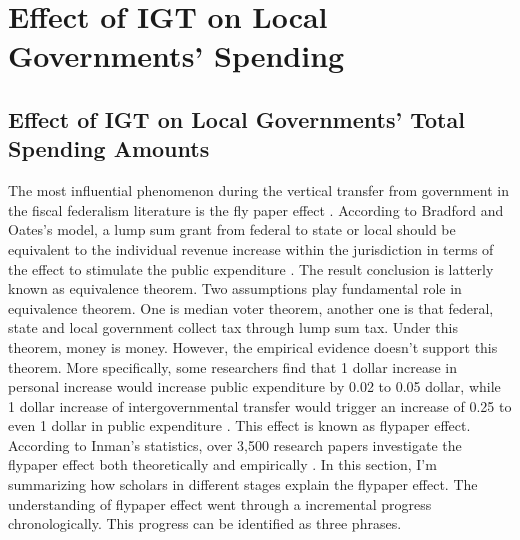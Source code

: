 \section{Effect of IGT on Local Governments' Spending}

\subsection*{Effect of IGT on Local Governments' Total Spending Amounts}
The most influential phenomenon during the vertical transfer from government in the fiscal federalism literature is the fly paper effect \cite{hines1995anomalies,gamkhar2007impact}. According to Bradford and Oates’s model, a lump sum grant from federal to state or local should be equivalent to the individual revenue increase within the jurisdiction in terms of the effect to stimulate the public expenditure \cite{bradford1971analysis}. The result conclusion is latterly known as equivalence theorem. Two assumptions play fundamental role in equivalence theorem. One is median voter theorem, another one is that federal, state and local government collect tax through lump sum tax. Under this theorem, money is money. However, the empirical evidence doesn’t support this theorem. More specifically, some researchers find that 1 dollar increase in personal increase would increase public expenditure by 0.02 to 0.05 dollar, while 1 dollar increase of intergovernmental transfer would trigger an increase of 0.25 to even 1 dollar in public expenditure \cite{bailey1998flypaper,dollery1996empirical, gamkhar2007impact}. This effect is known as flypaper effect. According to Inman's statistics, over 3,500 research papers investigate the flypaper effect both theoretically and empirically \cite{inman2008flypaper}. In this section, I’m summarizing how scholars in different stages explain the flypaper effect. The understanding of flypaper effect went through a incremental progress chronologically. This progress can be identified as three phrases.

\subsubsection{}




\section{}




